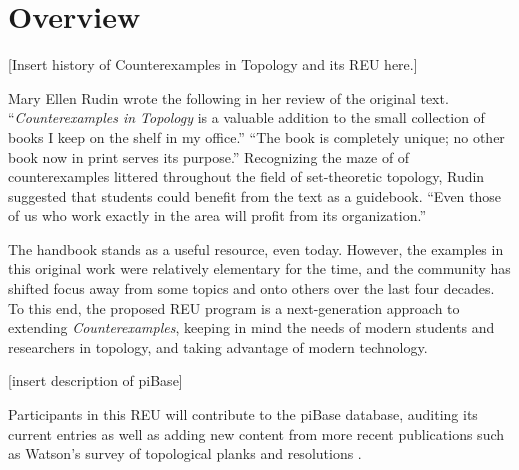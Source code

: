 



  \section{Overview}

  [Insert history of Counterexamples in Topology and its REU here.]

  Mary Ellen Rudin wrote the following in her review \cite{MR1536430}
  of the original text.
  ``\textit{Counterexamples in Topology} is a valuable addition to the small
  collection of books I keep on the shelf in my office.'' ``The book is
  completely unique; no other book now in print serves its purpose.''
  Recognizing the maze of of counterexamples littered throughout the
  field of set-theoretic topology, Rudin suggested that students could
  benefit from the text as a guidebook.
  ``Even those of us who work exactly in the area will profit from
  its organization.''

  The handbook stands as a useful resource, even today.
  However, the examples in this original work were relatively elementary for
  the time, and the community has shifted focus
  away from some topics and onto others over the last four decades.
  To this end,
  the proposed REU program is a next-generation approach to extending
  \textit{Counterexamples}, keeping in mind the needs of
  modern students and researchers in topology, and taking advantage of modern
  technology.

  [insert description of piBase]

  Participants in this REU will contribute to the piBase database, auditing
  its current entries as well as adding new content from more recent
  publications such as Watson's survey of topological planks and
  resolutions \cite{MR1229141}.

